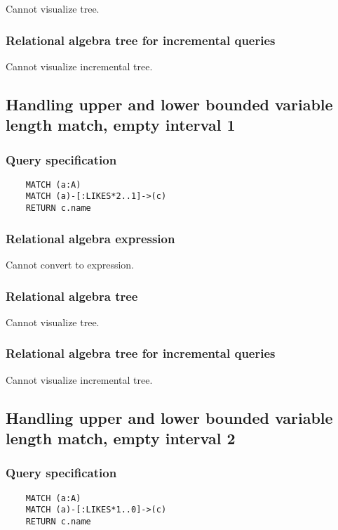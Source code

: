 	Cannot visualize tree.

	\subsubsection*{Relational algebra tree for incremental queries}

	Cannot visualize incremental tree.
	\subsection{Handling upper and lower bounded variable length match, empty interval 1}

	\subsubsection*{Query specification}

	\begin{lstlisting}
	MATCH (a:A)
	MATCH (a)-[:LIKES*2..1]->(c)
	RETURN c.name
	\end{lstlisting}


	\subsubsection*{Relational algebra expression}

	Cannot convert to expression.

	\subsubsection*{Relational algebra tree}

	Cannot visualize tree.

	\subsubsection*{Relational algebra tree for incremental queries}

	Cannot visualize incremental tree.
	\subsection{Handling upper and lower bounded variable length match, empty interval 2}

	\subsubsection*{Query specification}

	\begin{lstlisting}
	MATCH (a:A)
	MATCH (a)-[:LIKES*1..0]->(c)
	RETURN c.name
	\end{lstlisting}


